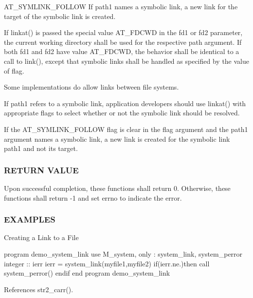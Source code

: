 A\+T\+\_\+\+S\+Y\+M\+L\+I\+N\+K\+\_\+\+F\+O\+L\+L\+OW If path1 names a symbolic link, a new link for the target of the symbolic link is created.

If linkat() is passed the special value A\+T\+\_\+\+F\+D\+C\+WD in the fd1 or fd2 parameter, the current working directory shall be used for the respective path argument. If both fd1 and fd2 have value A\+T\+\_\+\+F\+D\+C\+WD, the behavior shall be identical to a call to link(), except that symbolic links shall be handled as specified by the value of flag.

Some implementations do allow links between file systems.

If path1 refers to a symbolic link, application developers should use linkat() with appropriate flags to select whether or not the symbolic link should be resolved.

If the A\+T\+\_\+\+S\+Y\+M\+L\+I\+N\+K\+\_\+\+F\+O\+L\+L\+OW flag is clear in the flag argument and the path1 argument names a symbolic link, a new link is created for the symbolic link path1 and not its target.

\subsubsection*{R\+E\+T\+U\+RN V\+A\+L\+UE}

Upon successful completion, these functions shall return 0. Otherwise, these functions shall return -\/1 and set errno to indicate the error.

\subsubsection*{E\+X\+A\+M\+P\+L\+ES}

Creating a Link to a File

program demo\+\_\+system\+\_\+link use M\+\_\+system, only \+: system\+\_\+link, system\+\_\+perror integer \+:\+: ierr ierr = system\+\_\+link(\textquotesingle{}myfile1\textquotesingle{},\textquotesingle{}myfile2\textquotesingle{}) if(ierr.\+ne.)then call system\+\_\+perror(\textquotesingle{}) endif end program demo\+\_\+system\+\_\+link 

References str2\+\_\+carr().

